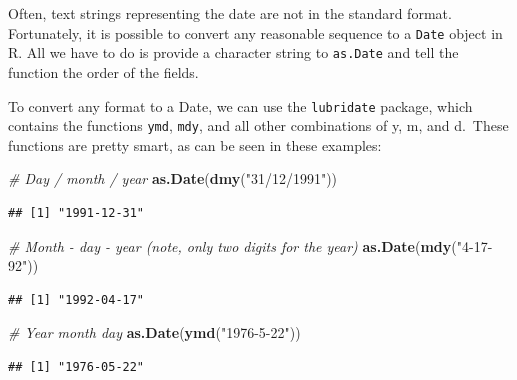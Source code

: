 \documentclass[]{book}
\newenvironment{Shaded}{\begin{snugshade}}{\end{snugshade}}
\newcommand{\CommentTok}[1]{\textcolor[rgb]{0.56,0.35,0.01}{\textit{#1}}}
\newcommand{\DataTypeTok}[1]{\textcolor[rgb]{0.13,0.29,0.53}{#1}}
\newcommand{\KeywordTok}[1]{\textcolor[rgb]{0.13,0.29,0.53}{\textbf{#1}}}
\newcommand{\NormalTok}[1]{#1}
\newcommand{\StringTok}[1]{\textcolor[rgb]{0.31,0.60,0.02}{#1}}
\begin{document}
Often, text strings representing the date are not in the standard format. Fortunately, it is possible to convert any reasonable sequence to a \texttt{Date} object in R. All we have to do is provide a character string to \texttt{as.Date} and tell the function the order of the fields.

To convert any format to a Date, we can use the \texttt{lubridate} package, which contains the functions \texttt{ymd}, \texttt{mdy}, and all other combinations of y, m, and d.~These functions are pretty smart, as can be seen in these examples:

\begin{Shaded}
\begin{Highlighting}[]
\CommentTok{# Day / month / year}
\KeywordTok{as.Date}\NormalTok{(}\KeywordTok{dmy}\NormalTok{(}\StringTok{"31/12/1991"}\NormalTok{))}
\end{Highlighting}
\end{Shaded}

\begin{verbatim}
## [1] "1991-12-31"
\end{verbatim}

\begin{Shaded}
\begin{Highlighting}[]
\CommentTok{# Month - day - year (note, only two digits for the year)}
\KeywordTok{as.Date}\NormalTok{(}\KeywordTok{mdy}\NormalTok{(}\StringTok{"4-17-92"}\NormalTok{))}
\end{Highlighting}
\end{Shaded}

\begin{verbatim}
## [1] "1992-04-17"
\end{verbatim}

\begin{Shaded}
\begin{Highlighting}[]
\CommentTok{# Year month day}
\KeywordTok{as.Date}\NormalTok{(}\KeywordTok{ymd}\NormalTok{(}\StringTok{"1976-5-22"}\NormalTok{))}
\end{Highlighting}
\end{Shaded}

\begin{verbatim}
## [1] "1976-05-22"
\end{verbatim}

\begin{Shaded}
\end{Shaded}
\end{document}
